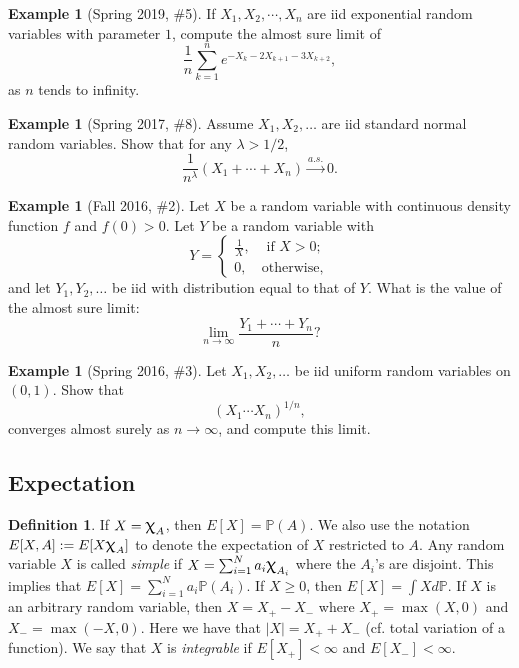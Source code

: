 \documentclass[12pt,reqno]{article}
\renewcommand{\emph}[1]{\textit{#1}}
\theoremstyle{plain}
\theoremstyle{definition}
\newtheorem{definition}[theorem]{Definition}
\newtheorem{example}[theorem]{Example}
\renewcommand{\chi}{\scalebox{1.25}{$\upchi$}}
\begin{document}
\begin{example}[Spring 2019, \#5]
If $X_1,X_2,\cdots,X_n$ are iid exponential random variables with parameter $1$, 
compute the almost sure limit of 
\[
\frac{1}{n} \sum_{k=1}^n e^{-X_k-2X_{k+1}-3X_{k+2}}, 
\]
as $n$ tends to infinity. 
\end{example} 

\begin{example}[Spring 2017, \#8] 
Assume $X_1,X_2,\ldots$ are iid standard normal random variables. 
Show that for any $\lambda > 1/2$, 
\[
\frac{1}{n^{\lambda}}(X_1+\cdots+X_n) \xrightarrow{a.s.} 0. 
\]
\end{example} 

\begin{example}[Fall 2016, \#2]
Let $X$ be a random variable with continuous density function $f$ and 
$f(0) > 0$. Let $Y$ be a random variable with 
\[
Y = \begin{cases} \frac{1}{X}, & \text{ if $X > 0$; } \\ 0, & 
     \text{otherwise,} \end{cases}
\]
and let $Y_1,Y_2,\ldots$ be iid with distribution equal to that of $Y$. 
What is the value of the almost sure limit:
\[
\lim_{n \rightarrow \infty} \frac{Y_1+\cdots+Y_n}{n}?
\]
\end{example} 

\begin{example}[Spring 2016, \#3]
Let $X_1,X_2,\ldots$ be iid uniform random variables on $(0,1)$. Show that 
\[
(X_1 \cdots X_n)^{1/n}, 
\]
converges almost surely as $n \rightarrow \infty$, and compute this limit. 
\end{example} 

\subsection{Expectation} 

\begin{definition}
If $X = \chi_A$, then $E[X] = \mathbb{P}(A)$. We also use the notation 
$E[X,A] := E[X \chi_A]$ to denote the expectation of $X$ restricted to $A$. 
Any random variable $X$ is 
called \emph{simple} if $X = \sum_{i=1}^N a_i \chi_{A_i}$ where the 
$A_i$'s are disjoint. This implies that 
$E[X] = \sum_{i=1}^N a_i \mathbb{P}(A_i)$. 
If $X \geq 0$, then $E[X] = \int X d\mathbb{P}$. 
If $X$ is an arbitrary random variable, then $X = X_{+} - X_{-}$ where 
$X_{+} = \max(X, 0)$ and $X_{-} = \max(-X, 0)$. Here we have that 
$|X| = X_{+} + X_{-}$ (cf. total variation of a function). 
We say that $X$ is \emph{integrable} if $E[X_{+}] < \infty$ and 
$E[X_{-}] < \infty$. 
\end{definition} 
\end{document}
